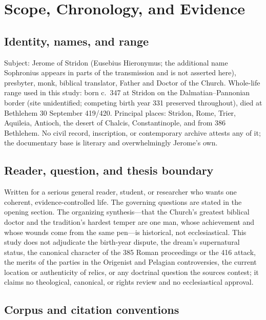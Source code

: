 \section{Scope, Chronology, and Evidence}

\subsection{Identity, names, and range}

Subject: Jerome of Stridon (Eusebius Hieronymus; the additional name
Sophronius appears in parts of the transmission and is not asserted here),
presbyter, monk, biblical translator, Father and Doctor of the Church.
Whole-life range used in this study: born c.~347 at Stridon on the
Dalmatian--Pannonian border (site unidentified; competing birth year 331
preserved throughout), died at Bethlehem 30 September 419/420. Principal
places: Stridon, Rome, Trier, Aquileia, Antioch, the desert of Chalcis,
Constantinople, and from 386 Bethlehem. No civil record, inscription, or
contemporary archive attests any of it; the documentary base is literary and
overwhelmingly Jerome's own.

\subsection{Reader, question, and thesis boundary}

Written for a serious general reader, student, or researcher who wants one
coherent, evidence-controlled life. The governing questions are stated in the
opening section. The organizing synthesis---that the Church's greatest
biblical doctor and the tradition's hardest temper are one man, whose
achievement and whose wounds come from the same pen---is historical, not
ecclesiastical. This study does not adjudicate the birth-year dispute, the
dream's supernatural status, the canonical character of the 385 Roman
proceedings or the 416 attack, the merits of the parties in the Origenist and
Pelagian controversies, the current location or authenticity of relics, or
any doctrinal question the sources contest; it claims no theological,
canonical, or rights review and no ecclesiastical approval.

\subsection{Corpus and citation conventions}

